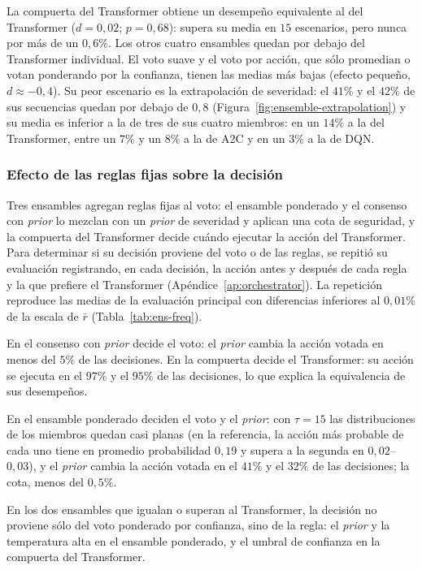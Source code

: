 \documentclass[../00_Main/Main.tex]{subfiles}
\begin{document}
La compuerta del Transformer obtiene un desempe\~no equivalente al del
Transformer ($d = 0{,}02$; $p = 0{,}68$): supera su media en $15$
escenarios, pero nunca por m\'as de un $0{,}6\%$. Los otros cuatro ensambles
quedan por debajo del Transformer individual. El voto suave y el voto por
acci\'on, que s\'olo promedian o votan ponderando por la confianza, tienen
las medias m\'as bajas (efecto peque\~no, $d \approx -0{,}4$). Su peor
escenario es la extrapolaci\'on de severidad: el $41\%$ y el $42\%$ de sus
secuencias quedan por debajo de $0{,}8$
(Figura~\ref{fig:ensemble-extrapolation}) y su media es inferior a
la de tres de sus cuatro miembros: en un $14\%$ a la del
Transformer, entre un $7\%$ y un $8\%$ a la de A2C y en un $3\%$ a la de
DQN.

\subsubsection{Efecto de las reglas fijas sobre la decisi\'on}\label{sec:res-freq}

Tres ensambles agregan reglas fijas al voto: el ensamble ponderado y el
consenso con \emph{prior} lo mezclan con un \emph{prior} de severidad y
aplican una cota de seguridad, y la compuerta del Transformer decide
cu\'ando ejecutar la acci\'on del Transformer. Para determinar si su decisi\'on proviene del voto o de las reglas, se repiti\'o su
evaluaci\'on registrando, en cada decisi\'on, la
acci\'on antes y despu\'es de cada regla y la que prefiere el Transformer
(Ap\'endice~\ref{ap:orchestrator}). La repetici\'on reproduce las medias de
la evaluaci\'on principal con diferencias inferiores al $0{,}01\%$ de la
escala de $\bar r$ (Tabla~\ref{tab:ens-freq}).

En el consenso con \emph{prior} decide el voto: el \emph{prior} cambia la
acci\'on votada en menos del $5\%$ de las decisiones. En la compuerta decide el Transformer: su acci\'on se ejecuta
en el $97\%$ y el $95\%$ de las decisiones, lo que explica la equivalencia
de sus desempe\~nos.

En el ensamble ponderado deciden el voto y el
\emph{prior}: con $\tau = 15$ las distribuciones de los miembros quedan
casi planas (en la referencia, la acci\'on m\'as probable de cada uno tiene
en promedio probabilidad $0{,}19$ y supera a la segunda en
$0{,}02$--$0{,}03$), y el \emph{prior} cambia la acci\'on votada en el
$41\%$ y el $32\%$ de las decisiones; la cota, menos del $0{,}5\%$.

En los dos ensambles que igualan o superan al Transformer, la decisi\'on no
proviene s\'olo del voto ponderado por confianza, sino de la regla: el
\emph{prior} y la temperatura alta en el ensamble ponderado, y el umbral
de confianza en la compuerta del Transformer.
\end{document}

